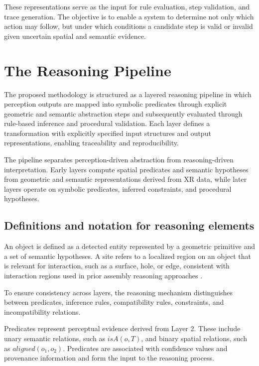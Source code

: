 \documentclass[11pt,titlepage,openright]{book}
\begin{document}
These representations serve as the input for rule evaluation, step validation, and trace generation. The objective is to enable a system to determine not only which action may follow, but under which conditions a candidate step is valid or invalid given uncertain spatial and semantic evidence.

\section{The Reasoning Pipeline}
\label{sec:method-reasoning-pipeline}

The proposed methodology is structured as a layered reasoning pipeline in which perception outputs are mapped into symbolic predicates through explicit geometric and semantic abstraction steps and subsequently evaluated through rule-based inference and procedural validation. Each layer defines a transformation with explicitly specified input structures and output representations, enabling traceability and reproducibility.

The pipeline separates perception-driven abstraction from reasoning-driven interpretation. Early layers compute spatial predicates and semantic hypotheses from geometric and semantic representations derived from XR data, while later layers operate on symbolic predicates, inferred constraints, and procedural hypotheses.



\subsection{Definitions and notation for reasoning elements}
\label{subsec:method-reasoning-definition}

An object is defined as a detected entity represented by a geometric primitive and a set of semantic hypotheses. A site refers to a localized region on an object that is relevant for interaction, such as a surface, hole, or edge, consistent with interaction regions used in prior assembly reasoning approaches \citet{WangEtAl2018}.

To ensure consistency across layers, the reasoning mechanism distinguishes between predicates, inference rules, compatibility rules, constraints, and incompatibility relations.

Predicates represent perceptual evidence derived from Layer 2. These include unary semantic relations, such as $isA(o, T)$, and binary spatial relations, such as $aligned(o_1,o_2)$. Predicates are associated with confidence values and provenance information and form the input to the reasoning process.
\end{document}
